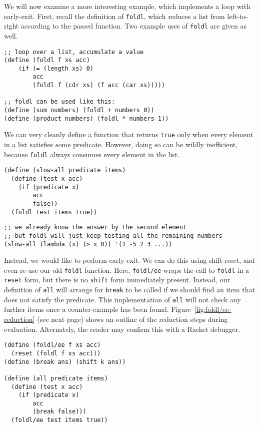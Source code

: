 \documentclass[11pt]{article}
\begin{document}
We will now examine a more interesting example, which implements a loop with early-exit.
First, recall the definition of \texttt{foldl}, which reduces a list from left-to-right according to the passed function.
Two example uses of \texttt{foldl} are given as well.

\begin{verbatim}
;; loop over a list, accumulate a value
(define (foldl f xs acc)
    (if (= (length xs) 0)
        acc
        (foldl f (cdr xs) (f acc (car xs)))))

;; foldl can be used like this:
(define (sum numbers) (foldl + numbers 0))
(define (product numbers) (foldl * numbers 1))
\end{verbatim}

We can very cleanly define a function that returns \texttt{true} only when every element in a list satisfies some predicate.
However, doing so can be wildly inefficient, because \texttt{foldl} always consumes every element in the list.

\begin{verbatim}
(define (slow-all predicate items)
  (define (test x acc)
    (if (predicate x)
        acc
        false))
  (foldl test items true))
\end{verbatim}
\newpage
\begin{verbatim}  
;; we already know the answer by the second element
;; but foldl will just keep testing all the remaining numbers
(slow-all (lambda (x) (> x 0)) '(1 -5 2 3 ...))
\end{verbatim}

Instead, we would like to perform early-exit.
We can do this using shift-reset, and even re-use our old \texttt{foldl} function.
Here, \texttt{foldl/ee} wraps the call to \texttt{foldl} in a \texttt{reset} form, but there is no \texttt{shift} form immediately present.
Instead, our definition of \texttt{all} will arrange for \texttt{break} to be called if we should find an item that does not satisfy the predicate.
This implementation of \texttt{all} will not check any further items once a counter-example has been found.
Figure~\ref{fig:foldl/ee-reduction} (see next page) shows an outline of the reduction steps during evaluation.
Alternately, the reader may confirm this with a Racket debugger.

\begin{verbatim}
(define (foldl/ee f xs acc)
  (reset (foldl f xs acc)))
(define (break ans) (shift k ans))

(define (all predicate items)
  (define (test x acc)
    (if (predicate x)
        acc
        (break false)))
  (foldl/ee test items true))
\end{verbatim}
\end{document}
